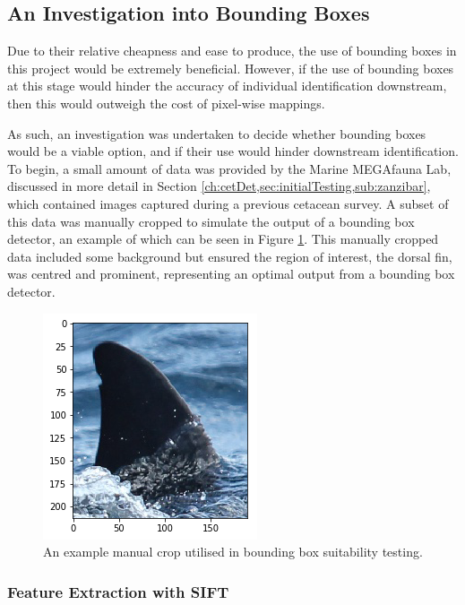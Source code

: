 \subsection{An Investigation into Bounding Boxes}\label{ch:cetDet,sec:deciding,sub:boundingBoxInvestigation}

Due to their relative cheapness and ease to produce, the use of bounding boxes in this project would be extremely beneficial. However, if the use of bounding boxes at this stage would hinder the accuracy of individual identification downstream, then this would outweigh the cost of pixel-wise mappings. 

As such, an investigation was undertaken to decide whether bounding boxes would be a viable option, and if their use would hinder downstream identification. To begin, a small amount of data was provided by the Marine MEGAfauna Lab, discussed in more detail in Section \ref{ch:cetDet,sec:initialTesting,sub:zanzibar}, which contained images captured during a previous cetacean survey. A subset of this data was manually cropped to simulate the output of a bounding box detector, an example of which can be seen in Figure \ref{fig:manual-crop-example}. This manually cropped data included some background but ensured the region of interest, the dorsal fin, was centred and prominent, representing an optimal output from a bounding box detector. 

\begin{figure}
	\begin{center}
		\includegraphics[scale=0.6]{Chapter3/figs/manual-crop-example.png}
	\end{center}
	\caption{An example manual crop utilised in bounding box suitability testing.
	}
	\label{fig:manual-crop-example}
\end{figure}

\subsubsection{Feature Extraction with SIFT}\label{ch:cetDet,sec:deciding,sub:boundingBoxInvestigation,subsub:SIFT}

